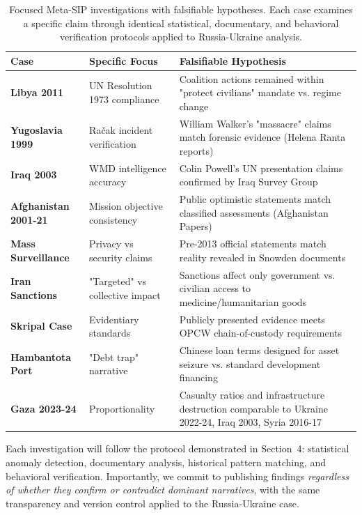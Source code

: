 \documentclass[11pt,a4paper]{article}
\begin{document}
\begin{table}[ht]
\centering
\small
\begin{tabular}{@{}p{3cm}p{4cm}p{5.5cm}@{}}
\toprule
\textbf{Case} & \textbf{Specific Focus} & \textbf{Falsifiable Hypothesis} \\
\midrule
\textbf{Libya 2011} & UN Resolution 1973 compliance & Coalition actions remained within 
"protect civilians" mandate vs. regime change \\
\addlinespace
\textbf{Yugoslavia 1999} & Račak incident verification & William Walker's "massacre" 
claims match forensic evidence (Helena Ranta reports) \\
\addlinespace
\textbf{Iraq 2003} & WMD intelligence accuracy & Colin Powell's UN presentation 
claims confirmed by Iraq Survey Group \\
\addlinespace
\textbf{Afghanistan 2001-21} & Mission objective consistency & Public optimistic 
statements match classified assessments (Afghanistan Papers) \\
\addlinespace
\textbf{Mass Surveillance} & Privacy vs security claims & Pre-2013 official statements 
match reality revealed in Snowden documents \\
\addlinespace
\textbf{Iran Sanctions} & "Targeted" vs collective impact & Sanctions affect only 
government vs. civilian access to medicine/humanitarian goods \\
\addlinespace
\textbf{Skripal Case} & Evidentiary standards & Publicly presented evidence meets 
OPCW chain-of-custody requirements \\
\addlinespace
\textbf{Hambantota Port} & "Debt trap" narrative & Chinese loan terms designed 
for asset seizure vs. standard development financing \\
\addlinespace
\textbf{Gaza 2023-24} & Proportionality & Casualty ratios and infrastructure 
destruction comparable to Ukraine 2022-24, Iraq 2003, Syria 2016-17 \\
\bottomrule
\end{tabular}
\caption{Focused Meta-SIP investigations with falsifiable hypotheses. Each case 
examines a specific claim through identical statistical, documentary, and behavioral 
verification protocols applied to Russia-Ukraine analysis.}
\label{tab:metasip_pipeline}
\end{table}

Each investigation will follow the protocol demonstrated in Section~4: 
statistical anomaly detection, documentary analysis, historical pattern matching, 
and behavioral verification. Importantly, we commit to publishing findings 
\textit{regardless of whether they confirm or contradict dominant narratives}, 
with the same transparency and version control applied to the Russia-Ukraine case.
\end{document}
